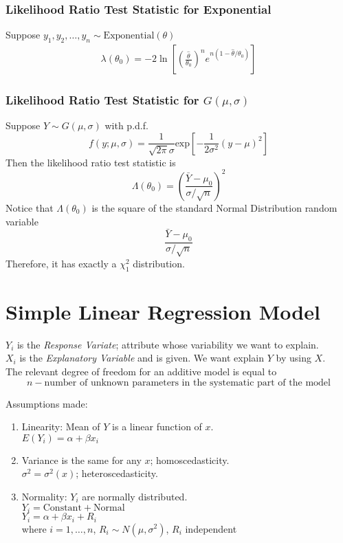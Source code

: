 \documentclass[12pt, leqno]{article}
\theoremstyle{definition}
\begin{document}
  \subsubsection{Likelihood Ratio Test Statistic for Exponential}
  Suppose $y_1, y_2, \dots, y_n \sim \text{Exponential}(\theta)$
  \begin{align*}
    \lambda(\theta_0) = -2
    \ln{
    \left[
      \left(\frac{\hat{\theta}}{\theta_0}\right)^{n}
      e^{n(1 - \hat{\theta}/\theta_0)}
    \right]
    }
  \end{align*}

  \subsubsection{Likelihood Ratio Test Statistic for $G(\mu, \sigma)$}
  Suppose $Y \sim G(\mu, \sigma)$ with p.d.f.
  $$
  f(y; \mu, \sigma) =
  \frac{1}{\sqrt{2\pi}\sigma}
  \text{exp}\left[-\frac{1}{2\sigma^{2}}(y - \mu)^{2}\right]
  $$
  Then the likelihood ratio test statistic is
  $$
  \Lambda(\theta_0) =
  \left(\frac{\bar{Y} - \mu_0}{\sigma/\sqrt{n}}
  \right)^{2}
  $$
  Notice that $\Lambda(\theta_0)$ is the square of the standard Normal Distribution random variable
  $$\frac{\bar{Y} - \mu_0}{\sigma/\sqrt{n}}$$
  Therefore, it has exactly a $\chi_{1}^{2}$ distribution.

  \newpage
  \section{Simple Linear Regression Model}
  $Y_{i}$ is the \emph{Response Variate}; attribute whose variability we want to explain. \\
  $X_{i}$ is the \emph{Explanatory Variable} and is given.
  We want explain $Y$ by using $X$. \\

  The relevant degree of freedom for an additive model is equal to
  $$n - \text{number of unknown parameters in the systematic part of the model}$$

  Assumptions made:
  \begin{enumerate}
    \item Linearity: Mean of $Y$ is a linear function of $x$.\\
    $E(Y_{i}) = \alpha + \beta x_{i}$
    \item Variance is the same for any $x$; homoscedasticity. \\
    $\sigma^{2} = \sigma^{2}(x)$; heteroscedasticity.
    \item Normality: $Y_{i}$ are normally distributed. \\
    $Y_{i} = \text{Constant} + \text{Normal}$ \\
    $Y_{i} = \alpha + \beta x_{i} + R_{i}$ \\
    where $i = 1, \dots, n$, $R_{i} \sim N(\mu, \sigma^{2})$, $R_{i}$ independent
  \end{enumerate}
\end{document}
